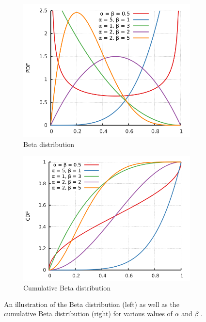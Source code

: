 \begin{figure}[htbp]
    \begin{subfigure}{0.49\textwidth}
        \includegraphics[width=\textwidth]{images/beta_various.png}
        \caption{Beta distribution}
        \label{fig:probability:probability_distributions:beta_normal}
    \end{subfigure}
    \begin{subfigure}{0.49\textwidth}
        \includegraphics[width=\textwidth]{images/beta_cumulative.png}
        \caption{Cumulative Beta distribution}
        \label{fig:probability:probability_distributions:beta_cumulative}
    \end{subfigure}
    \par\bigskip
    \caption{An illustration of the Beta distribution (left) \cite{ref:beta:2014} as well as the cumulative Beta distribution (right) \cite{ref:cumulativebeta:2014} for various values of $\alpha$ and $\beta$ .}
    \label{fig:probability:probability_distributions:beta}
\end{figure}



